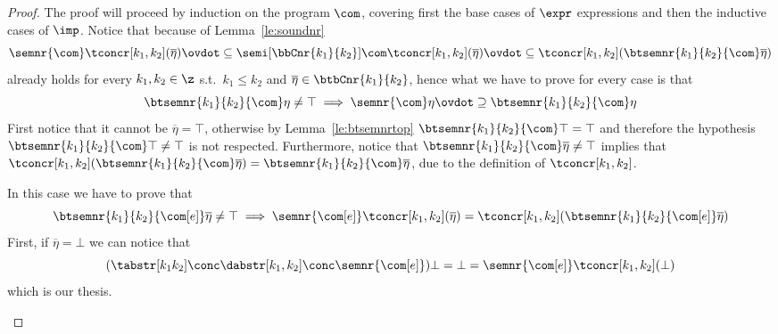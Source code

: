\begin{proof}
  The proof will proceed by induction on the program \(\com\),
  covering first the base cases of \(\expr\) expressions and then the
  inductive cases of \(\imp\). Notice that because of
  Lemma~\ref{le:soundnr}
  \begin{equation*}
    \semnr{\com}\tconcr[k_1,k_2](\overline\eta)
    \ovdot\subseteq
    \semi[\bbCnr{k_1}{k_2}]{\com}\tconcr[k_1,k_2](\overline\eta)
    \ovdot\subseteq
    \tconcr[k_1,k_2](\btsemnr{k_1}{k_2}{\com}\overline\eta)
  \end{equation*}
  already holds for every \(k_1, k_2 \in \z\) s.t.\ \(k_1\leq k_2\)
  and \(\overline\eta \in \btbCnr{k_1}{k_2}\), hence what we have to
  prove for every case is that
  \begin{equation*}
    \btsemnr{k_1}{k_2}{\com}\eta \neq \top \implies \semnr{\com} \eta \ovdot\supseteq \btsemnr{k_1}{k_2}{\com}\eta
  \end{equation*}
  First notice that it cannot be \(\overline\eta = \top\), otherwise
  by Lemma~\ref{le:btsemnrtop} \(\btsemnr{k_1}{k_2}{\com}\top = \top\)
  and therefore the hypothesis
  \(\btsemnr{k_1}{k_2}{\com}\top \neq \top\) is not
  respected. Furthermore, notice that
  \(\btsemnr{k_1}{k_2}{\com}\overline\eta \neq \top\) implies that
  \(\tconcr[k_1,k_2](\btsemnr{k_1}{k_2}{\com}\overline\eta) =
  \btsemnr{k_1}{k_2}{\com}\overline\eta\), due to the definition of
  \(\tconcr[k_1,k_2]\).
  \begin{inductive}
    \case{\(\com[e]\)} In this case we have to prove that
    \begin{equation*}
      \btsemnr{k_1}{k_2}{\com[e]}\overline{\eta} \neq \top \implies
      \semnr{\com[e]}\tconcr[k_1,k_2](\overline\eta) = \tconcr[k_1,k_2](\btsemnr{k_1}{k_2}{\com[e]}\overline\eta)
    \end{equation*}
    First, if \(\overline\eta = \bot\) we can notice that
    \begin{equation*}
      (\tabstr[k_1k_2] \conc \dabstr[k_1,k_2] \conc \semnr{\com[e]})\bot
      = \bot =
      \semnr{\com[e]}\tconcr[k_1,k_2](\bot)
    \end{equation*}
    which is our thesis.


\end{inductive}
\end{proof}
